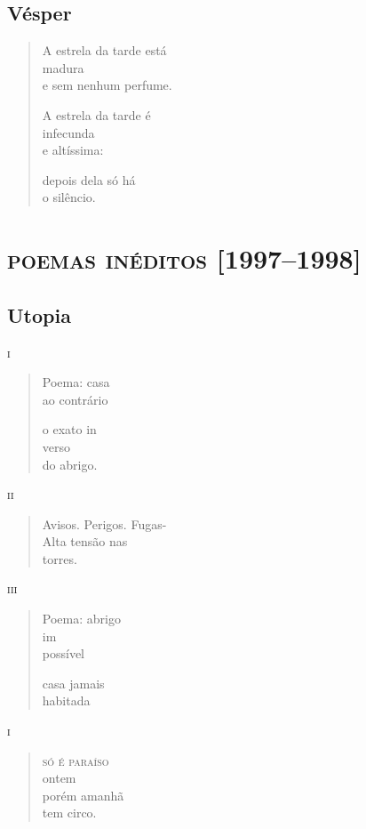 \chapter{Vésper}

\begin{verse}
A estrela da tarde está\\
madura\\
e sem nenhum perfume.

A estrela da tarde é\\
infecunda\\
e altíssima:

depois dela só há\\
o silêncio.
\end{verse}

\part{\textsc{poemas inéditos} {[}1997--1998{]}}

\chapter{Utopia}

\forceindent\textsc{i}

\begin{verse}
Poema: casa\\
ao contrário

o exato in\\
verso\\
do abrigo.
\end{verse}

\medskip
\textsc{ii}

\begin{verse}
Avisos. Perigos. Fugas-\\
Alta tensão nas\\
\qquad\qquad torres.
\end{verse}

\medskip
\textsc{iii}

\begin{verse}
Poema: abrigo\\
im\\
possível

casa jamais\\
habitada
\end{verse}

\pagebreak
\forceindent\textsc{i}

\begin{verse}
\qquad\quad \textsc{só é paraíso}\\
ontem\\
\qquad\quad porém amanhã\\
tem circo.
\end{verse}

